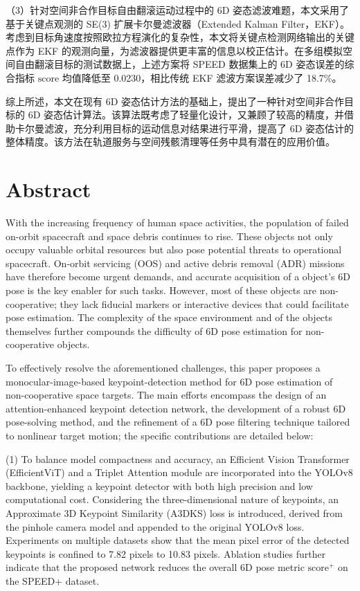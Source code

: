 （3）针对空间非合作目标自由翻滚运动过程中的 6D 姿态滤波难题，本文采用了基于关键点观测的 SE(3) 扩展卡尔曼滤波器（Extended Kalman Filter，EKF）。考虑到目标角速度按照欧拉方程演化的复杂性，本文将关键点检测网络输出的关键点作为 EKF 的观测向量，为滤波器提供更丰富的信息以校正估计。在多组模拟空间自由翻滚目标的测试数据上，上述方案将 SPEED 数据集上的 6D 姿态误差的综合指标 $\mathrm{score}$ 均值降低至 0.0230，相比传统 EKF 滤波方案误差减少了 18.7\%。

综上所述，本文在现有 6D 姿态估计方法的基础上，提出了一种针对空间非合作目标的 6D 姿态估计算法。该算法既考虑了轻量化设计，又兼顾了较高的精度，并借助卡尔曼滤波，充分利用目标的运动信息对结果进行平滑，提高了 6D 姿态估计的整体精度。该方法在轨道服务与空间残骸清理等任务中具有潜在的应用价值。



\intotoc\chapter*{Abstract}%
\setcounter{page}{1}%
With the increasing frequency of human space activities, the population of failed on-orbit spacecraft and space debris continues to rise. These objects not only occupy valuable orbital resources but also pose potential threats to operational spacecraft. On-orbit servicing (OOS) and active debris removal (ADR) missions have therefore become urgent demands, and accurate acquisition of a object's  6D pose is the key enabler for such tasks. However, most of these objects are non-cooperative; they lack fiducial markers or interactive devices that could facilitate pose estimation. The complexity of the space environment and of the objects themselves further compounds the difficulty of 6D pose estimation for non-cooperative objects.

To effectively resolve the aforementioned challenges, this paper proposes a monocular-image-based keypoint-detection method for 6D pose estimation of non-cooperative space targets. The main efforts encompass the design of an attention-enhanced keypoint detection network, the development of a robust 6D pose-solving method, and the refinement of a 6D pose filtering technique tailored to nonlinear target motion; the specific contributions are detailed below:

(1) To balance model compactness and accuracy, an Efficient Vision Transformer (EfficientViT) and a Triplet Attention module are incorporated into the YOLOv8 backbone, yielding a keypoint detector with both high precision and low computational cost.  
Considering the three-dimensional nature of keypoints, an Approximate 3D Keypoint Similarity (A3DKS) loss is introduced, derived from the pinhole camera model and appended to the original YOLOv8 loss. Experiments on multiple datasets show that the mean pixel error of the detected keypoints is confined to 7.82 pixels to 10.83 pixels. Ablation studies further indicate that the proposed network reduces the overall 6D pose metric $\mathrm{score^+}$ on the SPEED+ dataset.

